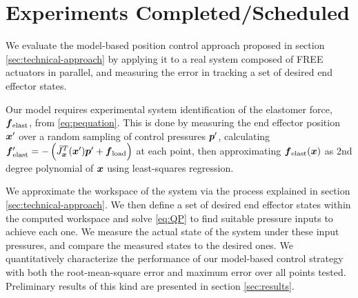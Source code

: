 \section{Experiments Completed/Scheduled}   \label{sec:experiments}

We evaluate the model-based position control approach proposed in section \ref{sec:technical-approach} by applying it to a real system composed of FREE actuators in parallel, and measuring the error in tracking a set of desired end effector states. 


Our model requires experimental system identification of the elastomer force, $\f_\tx{elast}$, from \eqref{eq:pequation}. This is done by measuring the end effector position $\x'$ over a random sampling of control pressures $\p'$, calculating $\f_\tx{elast}' = - \left( \J_{\x}^T (\x') \p' + \f_\tx{load} \right)$ at each point, then approximating $\f_\tx{elast} (\x)$ as 2nd degree polynomial of $\x$ using least-squares regression.

We approximate the workspace of the system via the process explained in section \ref{sec:technical-approach}. We then define a set of desired end effector states within the computed workspace and solve \eqref{eq:QP} to find suitable pressure inputs to achieve each one. We measure the actual state of the system under these input pressures, and compare the measured states to the desired ones. We quantitatively characterize the performance of our model-based control strategy with both the root-mean-square error and maximum error over all points tested. Preliminary results of this kind are presented in section \ref{sec:results}.


